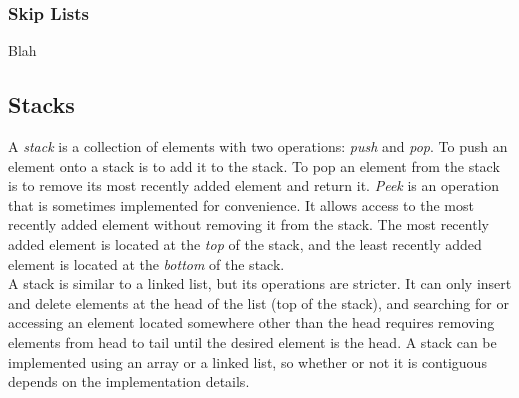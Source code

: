\subsubsection{Skip Lists}

Blah \\


\subsection{Stacks}

A \textit{stack} is a collection of elements with two operations: \textit{push} and \textit{pop}. To push an element onto a stack is to add it to the stack. To pop an element from the stack is to remove its most recently added element and return it. \textit{Peek} is an operation that is sometimes implemented for convenience. It allows access to the most recently added element without removing it from the stack. The most recently added element is located at the \textit{top} of the stack, and the least recently added element is located at the \textit{bottom} of the stack. \\

A stack is similar to a linked list, but its operations are stricter. It can only insert and delete elements at the head of the list (top of the stack), and searching for or accessing an element located somewhere other than the head requires removing elements from head to tail until the desired element is the head. A stack can be implemented using an array or a linked list, so whether or not it is contiguous depends on the implementation details. \\\\

